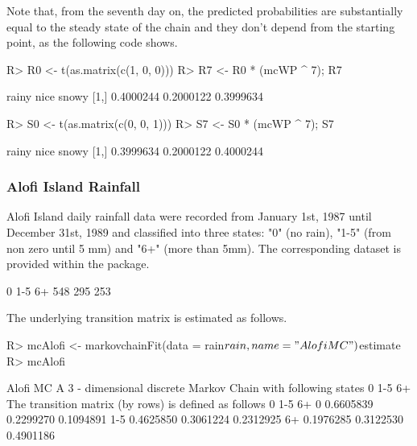 \documentclass[nojss]{jss}
\begin{document}
Note that, from the seventh day on, the predicted probabilities are substantially equal to the steady state of the chain and they don't depend from the starting point, as the following code shows.


\begin{Schunk}
\begin{Sinput}
R> R0 <- t(as.matrix(c(1, 0, 0)))
R> R7 <- R0 * (mcWP ^ 7); R7
\end{Sinput}
\begin{Soutput}
         rainy      nice     snowy
[1,] 0.4000244 0.2000122 0.3999634
\end{Soutput}
\begin{Sinput}
R> S0 <- t(as.matrix(c(0, 0, 1)))
R> S7 <- S0 * (mcWP ^ 7); S7
\end{Sinput}
\begin{Soutput}
         rainy      nice     snowy
[1,] 0.3999634 0.2000122 0.4000244
\end{Soutput}
\end{Schunk}

\subsubsection{Alofi Island Rainfall}\label{sec:wfAlofi}

Alofi Island daily rainfall
data were recorded from January 1st, 1987 until December 31st, 1989 and
classified into three states: "0" (no rain), "1-5" (from non zero until 5 mm) and "6+" (more than 5mm). The corresponding dataset is provided within the
 package.

\begin{Schunk}
\begin{Soutput}
  0 1-5  6+ 
548 295 253 
\end{Soutput}
\end{Schunk}

The underlying transition matrix is estimated as follows.

\begin{Schunk}
\begin{Sinput}
R> mcAlofi <- markovchainFit(data = rain$rain, name = "Alofi MC")$estimate
R> mcAlofi
\end{Sinput}
\begin{Soutput}
Alofi MC 
 A  3 - dimensional discrete Markov Chain with following states 
 0 1-5 6+ 
 The transition matrix   (by rows)  is defined as follows 
            0       1-5        6+
0   0.6605839 0.2299270 0.1094891
1-5 0.4625850 0.3061224 0.2312925
6+  0.1976285 0.3122530 0.4901186
\end{Soutput}
\end{Schunk}
\end{document}
